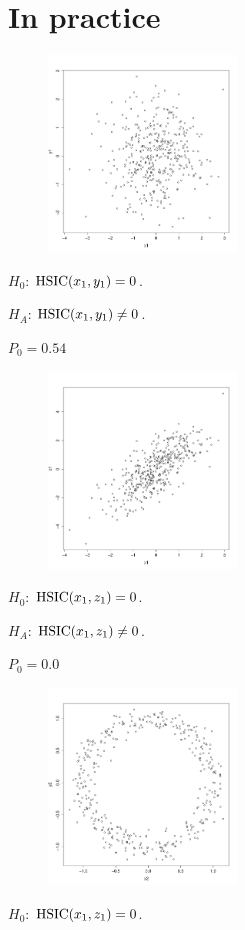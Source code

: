 \clearpage
\section{In practice}
\begin{figure}
  \begin{center}
    \includegraphics[width=5cm]{x1_vs_y1.pdf}
  \end{center}
\end{figure}
$H_0$: $\operatorname*{HSIC}(x_1, y_1)=0$.

$H_A$: $\operatorname*{HSIC}(x_1, y_1)\ne0$.

$P_0 = 0.54$

\clearpage
\begin{figure}
  \begin{center}
    \includegraphics[width=5cm]{x1_vs_z1.pdf}
  \end{center}
\end{figure}
$H_0$: $\operatorname*{HSIC}(x_1, z_1)=0$.

$H_A$: $\operatorname*{HSIC}(x_1, z_1)\ne0$.

$P_0 = 0.0$
\clearpage
\begin{figure}
  \begin{center}
    \includegraphics[width=5cm]{x2_vs_y2.pdf}
  \end{center}
\end{figure}
$H_0$: $\operatorname*{HSIC}(x_1, z_1)=0$.

